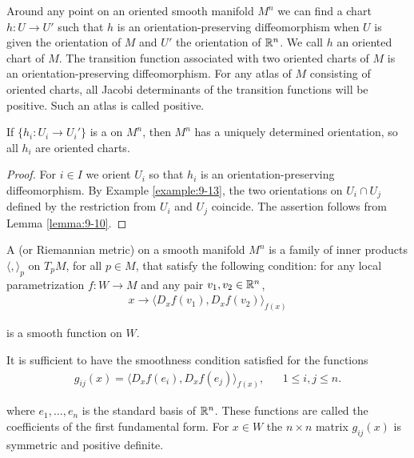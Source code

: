 Around any point on an oriented smooth manifold $M^n$ we can find a chart
$h:U\to U'$ such that $h$ is an orientation-preserving diffeomorphism when $U$ is
given the orientation of $M$ and $U'$ the orientation of ${\mathbb{R}}^n$. We call $h$ an oriented
chart of $M$. The transition function associated with two oriented charts of $M$
is an orientation-preserving diffeomorphism. For any atlas of $M$ consisting of
oriented charts, all Jacobi determinants of the transition functions will be positive.
Such an atlas is called positive.

\begin{proposition}\label{prop:9-14}
  If $\{h_i:U_i\to U_i'\}$ is a  on $M^n$, then $M^n$ has
a uniquely determined orientation, so all $h_i$ are oriented charts.
\end{proposition}

\begin{proof}
  For $i\in I$ we orient $U_i$ so that $h_i$ is an orientation-preserving diffeomorphism. 
  By Example \ref{example:9-13}, the two orientations on $U_i\cap U_j$ defined by the restriction
from $U_i$ and $U_j$ coincide. The assertion follows from Lemma \ref{lemma:9-10}.
\end{proof}

\begin{definition}\label{definition:9-15}
  A  (or Riemannian metric) on a smooth manifold $M^n$ is a family of 
  inner products $\langle , \rangle_p$ on $T_pM$, for all $p\in M$, that satisfy the following 
  condition: for any local parametrization $f:W\to M$ and any pair $v_1, v_2\in {\ensuremath{\mathbb{R}}}^n$,
  \begin{align*}
    x\to \langle D_xf(v_1), D_xf(v_2) \rangle_{f(x)}
  \end{align*}

  is a smooth function on $W$.
\end{definition}

It is sufficient to have the smoothness condition satisfied for the functions
\begin{align*}
  g_{ij}(x) = \langle D_xf(e_i), D_xf(e_j) \rangle_{f(x)}, && 1\le i, j\le n.
\end{align*}

where $e_1, \ldots, e_n$ is the standard basis of ${\mathbb{R}}^n$. These functions are called the
coefficients of the first fundamental form. For $x\in W$ the $n\times n$ matrix $g_{ij}(x)$
is symmetric and positive definite.

